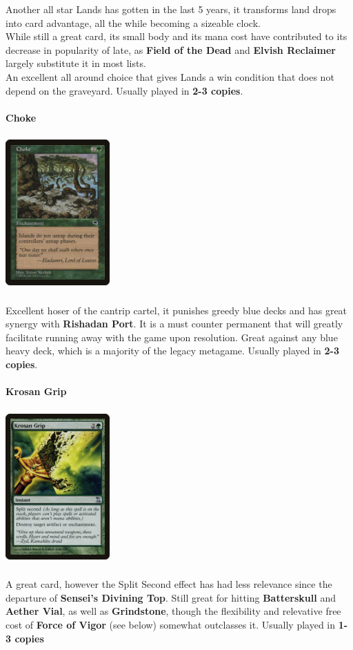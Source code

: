 \documentclass{report}
\begin{document}
Another all star Lands has gotten in the last 5 years, it transforms land drops into card advantage, all the while becoming a sizeable clock.\\While still a great card, its small body and its mana cost have contributed to its decrease in popularity of late, as \textbf{Field of the Dead} and \textbf{Elvish Reclaimer} largely substitute it in most lists.\\An excellent all around choice that gives Lands a win condition that does not depend on the graveyard. Usually played in \textbf{2-3 copies}.\\\\
\textbf{Choke\\}
\begin{center}
\includegraphics [width = 4cm, height = 6cm] {choke}
\end{center} Excellent hoser of the cantrip cartel, it punishes greedy blue decks and has great synergy with \textbf{Rishadan Port}. It is a must counter permanent that will greatly facilitate running away with the game upon resolution. Great against any blue heavy deck, which is a majority of the legacy metagame. Usually played in \textbf{2-3 copies}.\\\\
\textbf{Krosan Grip\\}
\begin{center}
\includegraphics [width = 4cm, height = 6cm] {krosan-grip}
\end{center}A great card, however the Split Second effect has had less relevance since the departure of \textbf{Sensei's Divining Top}. Still great for hitting \textbf{Batterskull} and \textbf{Aether Vial}, as well as \textbf{Grindstone}, though the flexibility and relevative free cost of \textbf{Force of Vigor} (see below) somewhat outclasses it. Usually played in \textbf{1-3 copies\\}\\
\end{document}
